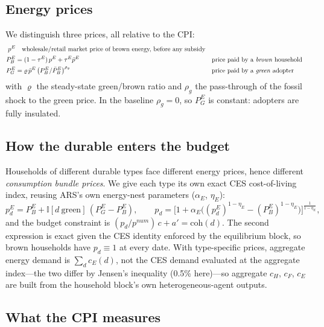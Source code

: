 \documentclass[11pt,a4paper]{article}
\begin{document}
\subsection{Energy prices}

We distinguish three prices, all relative to the CPI:
\begin{align*}
p^{E} &\quad\text{wholesale/retail market price of brown energy, before any subsidy}\\
P^{E}_{B} &= (1-\tau^{E})\,p^{E}+\tau^{E}\bar p^{E}
&&\text{price paid by a \emph{brown} household}\\
P^{E}_{G} &= \varrho\,\bar p^{E}\left(P^{E}_{B}/\bar P^{E}_{B}\right)^{\rho_g}
&&\text{price paid by a \emph{green} adopter}
\end{align*}
with $\varrho$ the steady-state green/brown ratio and $\rho_g$ the
pass-through of the fossil shock to the green price. In the baseline
$\rho_g=0$, so $P^{E}_{G}$ is constant: adopters are fully insulated.

\subsection{How the durable enters the budget}

Households of different durable types face different energy prices, hence
different \emph{consumption bundle prices}. We give each type its own exact
CES cost-of-living index, reusing ARS's own energy-nest parameters
($\alpha_E$, $\eta_E$):
\[
p^{E}_{d}=P^{E}_{B}+\mathbb{I}[d\ \text{green}]\,(P^{E}_{G}-P^{E}_{B}),
\qquad
p_{d}=\Big[1+\alpha_E\big((p^{E}_{d})^{1-\eta_E}-(P^{E}_{B})^{1-\eta_E}\big)\Big]^{\frac{1}{1-\eta_E}},
\]
and the budget constraint is $(p_{d}/p^{num})\,c+a'=\mathrm{coh}(d)$. The
second expression is exact given the CES identity enforced by the equilibrium
block, so brown households have $p_d\equiv 1$ at every date. With
type-specific prices, aggregate energy demand is $\sum_d c_E(d)$, not the CES
demand evaluated at the aggregate index---the two differ by Jensen's
inequality (0.5\% here)---so aggregate $c_H$, $c_F$, $c_E$ are built from
the household block's own heterogeneous-agent outputs.

\subsection{What the CPI measures}
\label{sec:cpi}
\end{document}
